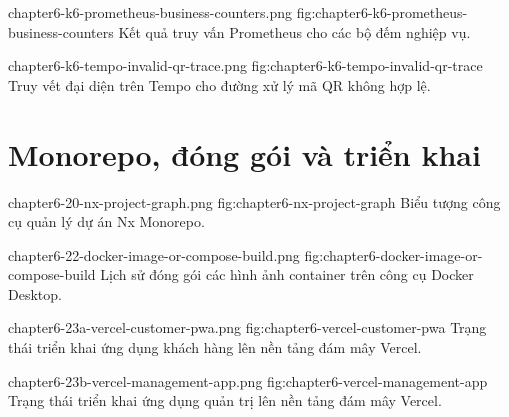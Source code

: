   {chapter6-k6-prometheus-business-counters.png}
  {fig:chapter6-k6-prometheus-business-counters}
  {Kết quả truy vấn Prometheus cho các bộ đếm nghiệp vụ.}

  {chapter6-k6-tempo-invalid-qr-trace.png}
  {fig:chapter6-k6-tempo-invalid-qr-trace}
  {Truy vết đại diện trên Tempo cho đường xử lý mã QR không hợp lệ.}

\section{Monorepo, đóng gói và triển khai}

  {chapter6-20-nx-project-graph.png}
  {fig:chapter6-nx-project-graph}
  {Biểu tượng công cụ quản lý dự án Nx Monorepo.}

  {chapter6-22-docker-image-or-compose-build.png}
  {fig:chapter6-docker-image-or-compose-build}
  {Lịch sử đóng gói các hình ảnh container trên công cụ Docker Desktop.}

  {chapter6-23a-vercel-customer-pwa.png}
  {fig:chapter6-vercel-customer-pwa}
  {Trạng thái triển khai ứng dụng khách hàng lên nền tảng đám mây Vercel.}

  {chapter6-23b-vercel-management-app.png}
  {fig:chapter6-vercel-management-app}
  {Trạng thái triển khai ứng dụng quản trị lên nền tảng đám mây Vercel.}

\FloatBarrier
\clearpage
